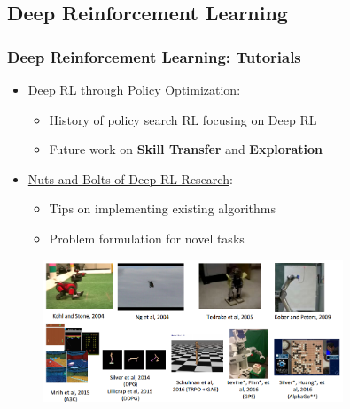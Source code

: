 \documentclass[11pt,
               hyperref={colorlinks,citecolor=pink,linkcolor=red,urlcolor=blue}
               ]{beamer}
\begin{document}
  \subsection{Deep Reinforcement Learning}

  \begin{frame}
    \frametitle{Deep Reinforcement Learning: Tutorials}

    \begin{itemize}
      \item \href{http://people.eecs.berkeley.edu/~pabbeel/nips-tutorial-policy-optimization-Schulman-Abbeel.pdf}{Deep RL through Policy Optimization\footnotemark[1]}:
        \begin{itemize}
          \item History of policy search RL focusing on Deep RL
          \item Future work on \textbf{Skill Transfer} and \textbf{Exploration}
        \end{itemize}
      \item \href{http://rll.berkeley.edu/deeprlcourse/docs/nuts-and-bolts.pdf}{Nuts and Bolts of Deep RL Research\footnotemark[2]}:
        \begin{itemize}
          \item Tips on implementing existing algorithms
          \item Problem formulation for novel tasks
        \end{itemize}
    \end{itemize}

    \begin{figure}
      \centering
      \includegraphics[width=0.8\textwidth]{drl1.png}
    \end{figure}

  \end{frame}
\end{document}

